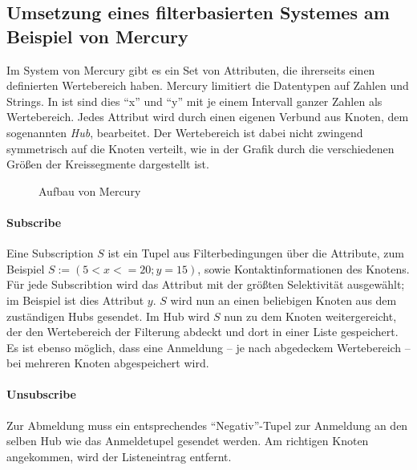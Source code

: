 \subsection[Umsetzung eines filterbasierten Systemes]{Umsetzung eines filterbasierten Systemes am Beispiel von Mercury}
\label{chap:related:mercury}
Im System von Mercury \cite{Bharambe2004Mercury} gibt es ein Set von Attributen, die ihrerseits einen definierten Wertebereich haben. Mercury limitiert die Datentypen auf Zahlen und Strings. In  ist sind dies ``x'' und ``y'' mit je einem Intervall ganzer Zahlen als Wertebereich. Jedes Attribut wird durch einen eigenen Verbund aus Knoten, dem sogenannten \emph{Hub}, bearbeitet. Der Wertebereich ist dabei nicht zwingend symmetrisch auf die Knoten verteilt, wie in der Grafik durch die verschiedenen Größen der Kreissegmente dargestellt ist. 

\begin{figure}[htbp]
\centering
{}
\caption{Aufbau von Mercury}
\label{fig:mercury}
\end{figure}

\paragraph{Subscribe}
Eine Subscription $S$ ist ein Tupel aus Filterbedingungen über die Attribute, zum Beispiel $S := (5 < x <= 20; y = 15)$, sowie Kontaktinformationen des Knotens. Für jede Subscribtion wird das Attribut mit der größten Selektivität ausgewählt; im Beispiel ist dies Attribut $y$. $S$ wird nun an einen beliebigen Knoten aus dem zuständigen Hubs gesendet. Im Hub wird $S$ nun zu dem Knoten weitergereicht, der den Wertebereich der Filterung abdeckt und dort in einer Liste gespeichert. Es ist ebenso möglich, dass eine Anmeldung -- je nach abgedeckem Wertebereich -- bei mehreren Knoten abgespeichert wird.

\paragraph{Unsubscribe}
Zur Abmeldung muss ein entsprechendes ``Negativ''-Tupel zur Anmeldung an den selben Hub wie das Anmeldetupel gesendet werden. Am richtigen Knoten angekommen, wird der Listeneintrag entfernt.

